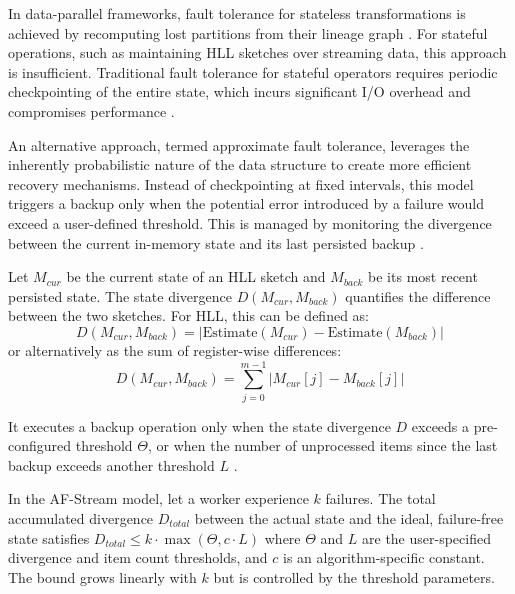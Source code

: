 In data-parallel frameworks, fault tolerance for stateless transformations is achieved by recomputing lost partitions from their lineage graph \cite{Zaharia2012ResilientDD}. For stateful operations, such as maintaining HLL sketches over streaming data, this approach is insufficient. Traditional fault tolerance for stateful operators requires periodic checkpointing of the entire state, which incurs significant I/O overhead and compromises performance \cite{Huang2016TowardHD}.

An alternative approach, termed approximate fault tolerance, leverages the inherently probabilistic nature of the data structure to create more efficient recovery mechanisms. Instead of checkpointing at fixed intervals, this model triggers a backup only when the potential error introduced by a failure would exceed a user-defined threshold. This is managed by monitoring the divergence between the current in-memory state and its last persisted backup \cite{Huang2016TowardHD}.

\begin{definition}
    Let $M_{cur}$ be the current state of an HLL sketch and $M_{back}$ be its most recent persisted state. The state divergence $D(M_{cur}, M_{back})$ quantifies the difference between the two sketches. For HLL, this can be defined as:
    \begin{equation*}
        D(M_{cur}, M_{back}) = |\text{Estimate}(M_{cur}) - \text{Estimate}(M_{back})|
    \end{equation*}
    or alternatively as the sum of register-wise differences:
    \begin{equation*}
        D(M_{cur}, M_{back}) = \sum_{j=0}^{m-1} |M_{cur}[j] - M_{back}[j]|
    \end{equation*}
\end{definition}

It executes a backup operation only when the state divergence $D$ exceeds a pre-configured threshold $\Theta$, or when the number of unprocessed items since the last backup exceeds another threshold $L$ \cite{Huang2016TowardHD}.

\begin{proposition}
    In the AF-Stream model, let a worker experience $k$ failures. The total accumulated divergence $D_{total}$ between the actual state and the ideal, failure-free state satisfies $D_{total} \leq k \cdot \max(\Theta, c \cdot L)$ where $\Theta$ and $L$ are the user-specified divergence and item count thresholds, and $c$ is an algorithm-specific constant. The bound grows linearly with $k$ but is controlled by the threshold parameters.
\end{proposition}

